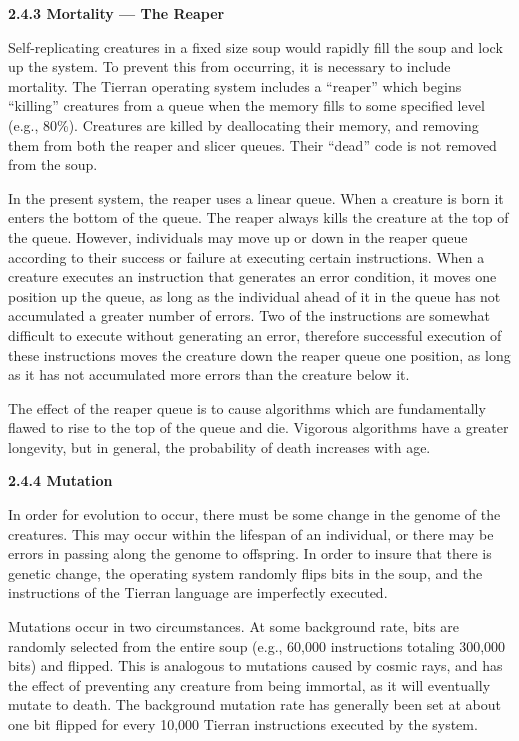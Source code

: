 \LP
\bf 2.4.3 Mortality --- The Reaper\rm
\eLP

Self-replicating creatures in a fixed size soup would rapidly fill the
soup and lock up the system.  To prevent this from occurring, it is
necessary to include mortality.  The Tierran operating system includes a
``reaper'' which begins ``killing'' creatures from a queue when the memory
fills to some specified level (e.g., 80\%).  Creatures are killed by
deallocating their memory, and removing them from both the reaper and
slicer queues.  Their ``dead'' code is not removed from the soup.

In the present system, the reaper uses a linear queue.  When a creature is
born it enters the bottom of the queue.  The reaper always kills the creature
at the top of the queue.  However, individuals may move up or down in the
reaper queue according to their success or failure at executing certain
instructions.  When a creature executes an instruction that generates an
error condition, it moves one position up the queue, as long as the
individual ahead of it in the queue has not accumulated a greater number
of errors.  Two of the instructions are somewhat difficult to execute
without generating an error, therefore successful execution of these
instructions moves the creature down the reaper queue one position, as long
as it has not accumulated more errors than the creature below it.

The effect of the reaper queue is to cause algorithms which are fundamentally
flawed to rise to the top of the queue and die.  Vigorous algorithms have a
greater longevity, but in general, the probability of death increases with age.

\LP
\bf 2.4.4 Mutation\rm
\eLP

In order for evolution to occur, there must be some change in the genome
of the creatures.  This may occur within the lifespan of an individual,
or there may be errors in passing along the genome to offspring.  In order
to insure that there is genetic change, the operating system randomly flips
bits in the soup, and the instructions of the Tierran language are
imperfectly executed.

Mutations occur in two circumstances.  At some background rate, bits are
randomly selected from the entire soup (e.g., 60,000 instructions totaling
300,000 bits) and flipped.  This is analogous to mutations caused by
cosmic rays, and has the effect of preventing any creature from being
immortal, as it will eventually mutate to death.  The background mutation
rate has generally been set at about one bit flipped for every 10,000
Tierran instructions executed by the system.

